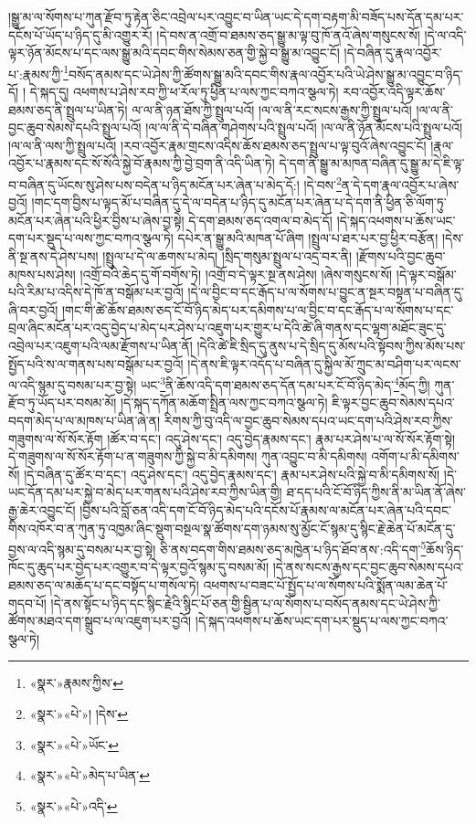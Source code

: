 །སྒྱུ་མ་ལ་སོགས་པ་ཀུན་རྫོབ་ཏུ་རྟེན་ཅིང་འབྲེལ་པར་འབྱུང་བ་ཡིན་ཡང་དེ་དག་བརྟག་མི་བཟོད་པས་དོན་དམ་པར་དངོས་པོ་ཡོད་པ་ཉིད་དུ་མི་འགྱུར་རོ། །དེ་བས་ན་འགྲོ་བ་ཐམས་ཅད་སྒྱུ་མ་ལྟ་བུ་ཁོ་ནའོ་ཞེས་གསུངས་སོ། །དེ་ལ་འདི་ལྟར་ཉོན་མོངས་པ་དང་ལས་སྒྱུ་མའི་དབང་གིས་སེམས་ཅན་གྱི་སྐྱེ་བ་སྒྱུ་མ་འབྱུང་ངོ། །དེ་བཞིན་དུ་རྣལ་འབྱོར་པ་:རྣམས་ཀྱི་\footnote{«སྣར་»རྣམས་ཀྱིས་}བསོད་ནམས་དང་ཡེ་ཤེས་ཀྱི་ཚོགས་སྒྱུ་མའི་དབང་གིས་རྣལ་འབྱོར་པའི་ཡེ་ཤེས་སྒྱུ་མ་འབྱུང་བ་ཉིད་དོ། །
དེ་སྐད་དུ། འཕགས་པ་ཤེས་རབ་ཀྱི་ཕ་རོལ་ཏུ་ཕྱིན་པ་ལས་ཀྱང་བཀའ་སྩལ་ཏེ། རབ་འབྱོར་འདི་ལྟར་ཆོས་ཐམས་ཅད་ནི་སྤྲུལ་པ་ཡིན་ཏེ། ལ་ལ་ནི་ཉན་ཐོས་ཀྱི་སྤྲུལ་པའོ། །ལ་ལ་ནི་རང་སངས་རྒྱས་ཀྱི་སྤྲུལ་པའོ། །ལ་ལ་ནི་བྱང་ཆུབ་སེམས་དཔའི་སྤྲུལ་པའོ། །ལ་ལ་ནི་དེ་བཞིན་གཤེགས་པའི་སྤྲུལ་པའོ། །ལ་ལ་ནི་ཉོན་མོངས་པའི་སྤྲུལ་པའོ། །ལ་ལ་ནི་ལས་ཀྱི་སྤྲུལ་པའོ། །རབ་འབྱོར་རྣམ་གྲངས་འདིས་ཆོས་ཐམས་ཅད་སྤྲུལ་པ་ལྟ་བུའོ་ཞེས་འབྱུང་ངོ། །རྣལ་འབྱོར་པ་རྣམས་དང་སོ་སོའི་སྐྱེ་བོ་རྣམས་ཀྱི་བྱེ་བྲག་ནི་འདི་ཡིན་ཏེ། དེ་དག་ནི་སྒྱུ་མ་མཁན་བཞིན་དུ་སྒྱུ་མ་དེ་ཇི་ལྟ་བ་བཞིན་དུ་ཡོངས་སུ་ཤེས་པས་བདེན་པ་ཉིད་མངོན་པར་ཞེན་པ་མེད་དོ:། །དེ་བས་\footnote{«སྣར་»«པེ་»། །དེས་}ན་དེ་དག་རྣལ་འབྱོར་པ་ཞེས་བྱའོ། །གང་དག་བྱིས་པ་ལྟད་མོ་པ་བཞིན་དུ་དེ་ལ་བདེན་པ་ཉིད་དུ་མངོན་པར་ཞེན་པ་དེ་དག་ནི་ཕྱིན་ཅི་ལོག་ཏུ་མངོན་པར་ཞེན་པའི་ཕྱིར་བྱིས་པ་ཞེས་བྱ་སྟེ། དེ་དག་ཐམས་ཅད་འགལ་བ་མེད་དོ། །དེ་སྐད་འཕགས་པ་ཆོས་ཡང་དག་པར་སྡུད་པ་ལས་ཀྱང་བཀའ་སྩལ་ཏེ། དཔེར་ན་སྒྱུ་མའི་མཁན་པོ་ཞིག །སྤྲུལ་པ་ཐར་པར་བྱ་ཕྱིར་བརྩོན། །དེས་ནི་སྔ་ནས་དེ་ཤེས་པས། །སྤྲུལ་པ་དེ་ལ་ཆགས་པ་མེད། །སྲིད་གསུམ་སྤྲུལ་པ་འདྲ་བར་ནི། །རྫོགས་པའི་བྱང་ཆུབ་མཁས་པས་ཤེས། །འགྲོ་བའི་ཆེད་དུ་གོ་བགོས་ཏེ། །འགྲོ་བ་དེ་ལྟར་སྔ་ནས་ཤེས། །ཞེས་གསུངས་སོ། །དེ་ལྟར་བསྒོམ་པའི་རིམ་པ་འདིས་དེ་ཁོ་ན་བསྒོམ་པར་བྱའོ། །དེ་ལ་བྱིང་བ་དང་རྒོད་པ་ལ་སོགས་པ་བྱུང་ན་སྔར་བསྟན་པ་བཞིན་དུ་ཞི་བར་བྱའོ། །གང་གི་ཚེ་ཆོས་ཐམས་ཅད་ངོ་བོ་ཉིད་མེད་པར་དམིགས་པ་ལ་བྱིང་བ་དང་རྒོད་པ་ལ་སོགས་པ་དང་བྲལ་ཞིང་མངོན་པར་འདུ་བྱེད་པ་མེད་པར་ཤེས་པ་འཇུག་པར་གྱུར་པ་དེའི་ཚེ་ཞི་གནས་དང་ལྷག་མཐོང་ཟུང་དུ་འབྲེལ་པར་འཇུག་པའི་ལམ་རྫོགས་པ་ཡིན་ནོ། །དེའི་ཚེ་ཇི་སྲིད་དུ་ནུས་པ་དེ་སྲིད་དུ་མོས་པའི་སྟོབས་ཀྱིས་མོས་པས་སྤྱོད་པའི་ས་ལ་གནས་པས་བསྒོམ་པར་བྱའོ། །དེ་ནས་ཇི་ལྟར་འདོད་པ་བཞིན་དུ་སྐྱིལ་མོ་ཀྲུང་མ་བཤིག་པར་ལངས་ལ་འདི་སྙམ་དུ་བསམ་པར་བྱ་སྟེ། ཡང་\footnote{«སྣར་»«པེ་»ཡོང་}ནི་ཆོས་འདི་དག་ཐམས་ཅད་དོན་དམ་པར་ངོ་བོ་ཉིད་མེད་\footnote{«སྣར་»«པེ་»མེད་པ་ཡིན་}མོད་ཀྱི། ཀུན་རྫོབ་ཏུ་ཡོད་པར་བསམ་མོ། །དེ་སྐད་དཀོན་མཆོག་སྤྲིན་ལས་ཀྱང་བཀའ་སྩལ་ཏེ། ཇི་ལྟར་བྱང་ཆུབ་སེམས་དཔའ་བདག་མེད་པ་ལ་མཁས་པ་ཡིན་ཞེ་ན། རིགས་ཀྱི་བུ་འདི་ལ་བྱང་ཆུབ་སེམས་དཔའ་ཡང་དག་པའི་ཤེས་རབ་ཀྱིས་གཟུགས་ལ་སོ་སོར་རྟོག །ཚོར་བ་དང་། འདུ་ཤེས་དང་། འདུ་བྱེད་རྣམས་དང་། རྣམ་པར་ཤེས་པ་ལ་སོ་སོར་རྟོག་སྟེ། དེ་གཟུགས་ལ་སོ་སོར་རྟོག་པ་ན་གཟུགས་ཀྱི་སྐྱེ་བ་མི་དམིགས། ཀུན་འབྱུང་བ་མི་དམིགས། འགོག་པ་མི་དམིགས་སོ། །དེ་བཞིན་དུ་ཚོར་བ་དང་། འདུ་ཤེས་དང་། འདུ་བྱེད་རྣམས་དང་། རྣམ་པར་ཤེས་པའི་སྐྱེ་བ་མི་དམིགས་སོ། །དེ་ཡང་དོན་དམ་པར་སྐྱེ་བ་མེད་པར་གནས་པའི་ཤེས་རབ་ཀྱིས་ཡིན་གྱི། ཐ་དད་པའི་ངོ་བོ་ཉིད་ཀྱིས་ནི་མ་ཡིན་ནོ་ཞེས་རྒྱ་ཆེར་འབྱུང་ངོ། །བྱིས་པའི་བློ་ཅན་འདི་དག་ངོ་བོ་ཉིད་མེད་པའི་དངོས་པོ་རྣམས་ལ་མངོན་པར་ཞེན་པའི་དབང་གིས་འཁོར་བ་ན་ཀུན་ཏུ་འཁྱམ་ཞིང་སྡུག་བསྔལ་སྣ་ཚོགས་དག་ཉམས་སུ་མྱོང་ངོ་སྙམ་དུ་སྙིང་རྗེ་ཆེན་པོ་མངོན་དུ་བྱས་ལ་འདི་སྙམ་དུ་བསམ་པར་བྱ་སྟེ། ཅི་ནས་བདག་གིས་ཐམས་ཅད་མཁྱེན་པ་ཉིད་ཐོབ་ནས་:འདི་དག་\footnote{«སྣར་»«པེ་»འདི་}ཆོས་ཉིད་ཁོང་དུ་ཆུད་པར་བྱེད་པར་འགྱུར་བ་དེ་ལྟར་བྱའོ་སྙམ་དུ་བསམ་མོ། །དེ་ནས་སངས་རྒྱས་དང་བྱང་ཆུབ་སེམས་དཔའ་ཐམས་ཅད་ལ་མཆོད་པ་དང་བསྟོད་པ་གསོལ་ཏེ། འཕགས་པ་བཟང་པོ་སྤྱོད་པ་ལ་སོགས་པའི་སྨོན་ལམ་ཆེན་པོ་གདབ་པོ། །དེ་ནས་སྟོང་པ་ཉིད་དང་སྙིང་རྗེའི་སྙིང་པོ་ཅན་གྱི་སྦྱིན་པ་ལ་སོགས་པ་བསོད་ནམས་དང་ཡེ་ཤེས་ཀྱི་ཚོགས་མཐའ་དག་སྒྲུབ་པ་ལ་འཇུག་པར་བྱའོ། །དེ་སྐད་འཕགས་པ་ཆོས་ཡང་དག་པར་སྡུད་པ་ལས་ཀྱང་བཀའ་སྩལ་ཏེ། 